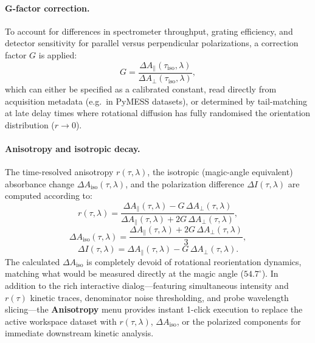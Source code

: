 \paragraph{G-factor correction.}
To account for differences in spectrometer throughput, grating efficiency, and detector sensitivity for parallel versus perpendicular polarizations, a correction factor $G$ is applied:
\begin{equation}
  G = \frac{\Delta A_\parallel(\tau_{\mathrm{iso}}, \lambda)}{\Delta A_\perp(\tau_{\mathrm{iso}}, \lambda)},
\end{equation}
which can either be specified as a calibrated constant, read directly from acquisition metadata (e.g.\ in PyMESS datasets), or determined by tail-matching at late delay times where rotational diffusion has fully randomised the orientation distribution ($r \to 0$).

\paragraph{Anisotropy and isotropic decay.}
The time-resolved anisotropy $r(\tau, \lambda)$, the isotropic (magic-angle equivalent) absorbance change $\Delta A_{\mathrm{iso}}(\tau, \lambda)$, and the polarization difference $\Delta I(\tau, \lambda)$ are computed according to:
\begin{equation}
  r(\tau, \lambda) = \frac{\Delta A_\parallel(\tau, \lambda) - G\, \Delta A_\perp(\tau, \lambda)}{\Delta A_\parallel(\tau, \lambda) + 2G\, \Delta A_\perp(\tau, \lambda)},
\end{equation}
\begin{equation}
  \Delta A_{\mathrm{iso}}(\tau, \lambda) = \frac{\Delta A_\parallel(\tau, \lambda) + 2G\, \Delta A_\perp(\tau, \lambda)}{3},
\end{equation}
\begin{equation}
  \Delta I(\tau, \lambda) = \Delta A_\parallel(\tau, \lambda) - G\, \Delta A_\perp(\tau, \lambda).
\end{equation}
The calculated $\Delta A_{\mathrm{iso}}$ is completely devoid of rotational reorientation dynamics, matching what would be measured directly at the magic angle ($54.7^\circ$). In addition to the rich interactive dialog—featuring simultaneous intensity and $r(\tau)$ kinetic traces, denominator noise thresholding, and probe wavelength slicing—the \textbf{Anisotropy} menu provides instant 1-click execution to replace the active workspace dataset with $r(\tau,\lambda)$, $\Delta A_{\mathrm{iso}}$, or the polarized components for immediate downstream kinetic analysis.

